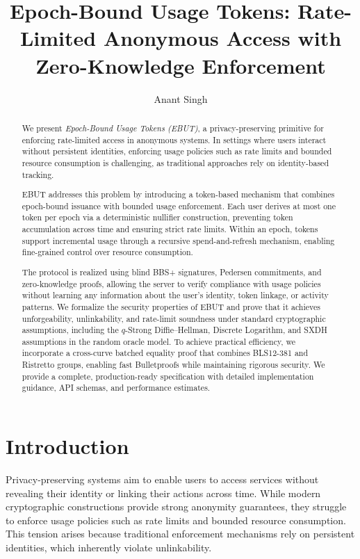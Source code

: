 \documentclass[11pt]{article}
\title{Epoch-Bound Usage Tokens: Rate-Limited Anonymous Access with Zero-Knowledge Enforcement}
\author{Anant Singh}
\date{}
\theoremstyle{definitionstyle}
\theoremstyle{plain}
\begin{document}
\maketitle

\begin{abstract}
We present \emph{Epoch-Bound Usage Tokens (EBUT)}, a privacy-preserving primitive for enforcing rate-limited access in anonymous systems. In settings where users interact without persistent identities, enforcing usage policies such as rate limits and bounded resource consumption is challenging, as traditional approaches rely on identity-based tracking.

EBUT addresses this problem by introducing a token-based mechanism that combines epoch-bound issuance with bounded usage enforcement. Each user derives at most one token per epoch via a deterministic nullifier construction, preventing token accumulation across time and ensuring strict rate limits. Within an epoch, tokens support incremental usage through a recursive spend-and-refresh mechanism, enabling fine-grained control over resource consumption.

The protocol is realized using blind BBS+ signatures, Pedersen commitments, and zero-knowledge proofs, allowing the server to verify compliance with usage policies without learning any information about the user's identity, token linkage, or activity patterns. We formalize the security properties of EBUT and prove that it achieves unforgeability, unlinkability, and rate-limit soundness under standard cryptographic assumptions, including the $q$-Strong Diffie--Hellman, Discrete Logarithm, and SXDH assumptions in the random oracle model. To achieve practical efficiency, we incorporate a cross-curve batched equality proof that combines BLS12-381 and Ristretto groups, enabling fast Bulletproofs while maintaining rigorous security. We provide a complete, production-ready specification with detailed implementation guidance, API schemas, and performance estimates.
\end{abstract}

\section{Introduction}

Privacy-preserving systems aim to enable users to access services without revealing their identity or linking their actions across time. While modern cryptographic constructions provide strong anonymity guarantees, they struggle to enforce usage policies such as rate limits and bounded resource consumption. This tension arises because traditional enforcement mechanisms rely on persistent identities, which inherently violate unlinkability.
\end{document}
